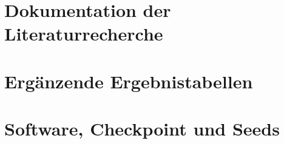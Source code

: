 \section{Dokumentation der Literaturrecherche}\label{sec:anhang-recherche}

\section{Ergänzende Ergebnistabellen}\label{sec:anhang-ergebnisse}

\section{Software, Checkpoint und Seeds}\label{sec:anhang-repro}
